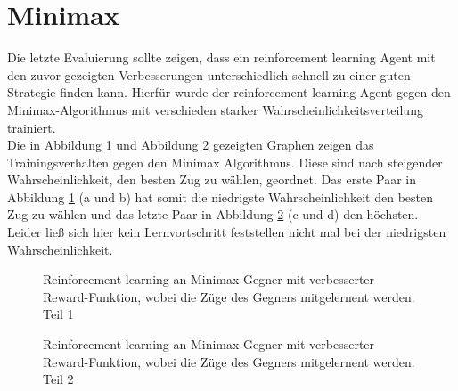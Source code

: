 \section{Minimax}
Die letzte Evaluierung sollte zeigen, dass ein reinforcement learning Agent mit den zuvor gezeigten Verbesserungen unterschiedlich schnell zu einer guten Strategie finden kann. 
Hierfür wurde der reinforcement learning Agent gegen den Minimax-Algorithmus mit verschieden starker Wahrscheinlichkeitsverteilung trainiert.\\
Die in Abbildung \ref{fig:MiniMaxReward1} und Abbildung \ref{fig:MiniMaxReward2} gezeigten Graphen zeigen das Trainingsverhalten gegen den Minimax Algorithmus. Diese sind nach steigender Wahrscheinlichkeit, den besten Zug zu wählen, geordnet. Das erste Paar in Abbildung \ref{fig:MiniMaxReward1} (a und b) hat somit die niedrigste Wahrscheinlichkeit den besten Zug zu wählen und das letzte Paar in Abbildung \ref{fig:MiniMaxReward2} (c und d) den höchsten.\\
Leider ließ sich hier kein Lernvortschritt feststellen nicht mal bei der niedrigsten Wahrscheinlichkeit. 

\begin{figure}%
    \centering
    \qquad
    \qquad
    \qquad
    \qquad
    \qquad
    \qquad
    \qquad
    \caption{Reinforcement learning an Minimax Gegner mit verbesserter Reward-Funktion, wobei die Züge des Gegners mitgelernent werden. Teil 1}%
    \label{fig:MiniMaxReward1}%
\end{figure}
\begin{figure}%
    \centering
    \qquad
    \qquad
    \qquad
    \caption{Reinforcement learning an Minimax Gegner mit verbesserter Reward-Funktion, wobei die Züge des Gegners mitgelernent werden. Teil 2}%
    \label{fig:MiniMaxReward2}%
\end{figure}

